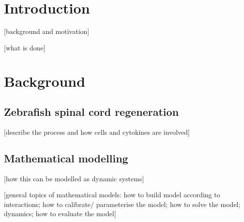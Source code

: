 \documentclass[12pt,a4paper]{report}
\begin{document}

\chapter{Introduction}





[background and motivation]

[what is done]

\chapter{Background}

\section{Zebrafish spinal cord regeneration}

[describe the process and how cells and cytokines are involved]

\section{Mathematical modelling}

[how this can be modelled as dynamic systems]

[general topics of mathematical models: how to build model according to interactions; how to calibrate/ parameterise the model; how to solve the model; dynamics; how to evaluate the model]
 
\end{document}
